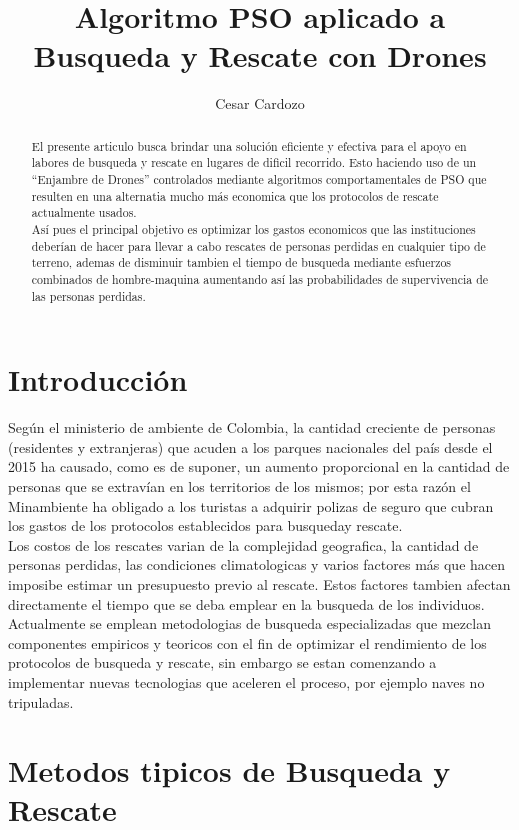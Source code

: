 \documentclass[11pt, twocolumn,letterpaper]{article}
\author{Cesar Cardozo}
\title{Algoritmo PSO aplicado a Busqueda y Rescate con Drones}
\begin{document}
\maketitle
\begin{abstract}
El presente articulo busca brindar una solución eficiente y efectiva para el apoyo en labores de busqueda y rescate en lugares de dificil recorrido. Esto haciendo uso de un ``Enjambre de Drones'' controlados mediante algoritmos comportamentales de PSO que resulten en una alternatia mucho más economica que los protocolos de rescate actualmente usados.\\

Así pues el principal objetivo es optimizar los gastos economicos que las instituciones deberían de hacer para llevar a cabo rescates de personas perdidas en cualquier tipo de terreno, ademas de disminuir tambien el tiempo de busqueda mediante esfuerzos combinados de hombre-maquina aumentando así las probabilidades de supervivencia de las personas perdidas.
\end{abstract}
\section{Introducción}
Según el ministerio de ambiente de Colombia, la cantidad creciente de personas (residentes y extranjeras) que acuden a los parques nacionales del país desde el 2015 ha causado, como es de suponer, un aumento proporcional en la cantidad de personas que se extravían en los territorios de los mismos; por esta razón el Minambiente ha obligado a los turistas a adquirir polizas de seguro que cubran los gastos de los protocolos establecidos para busqueday rescate.\\

Los costos de los rescates varian de la complejidad geografica, la cantidad de personas perdidas, las condiciones climatologicas y varios factores más que hacen imposibe estimar un presupuesto previo al rescate. Estos factores tambien afectan directamente el tiempo que se deba emplear en la busqueda de los individuos.\\

Actualmente se emplean metodologias de busqueda especializadas que mezclan componentes empiricos y teoricos con el fin de optimizar el rendimiento de los protocolos de busqueda y rescate, sin embargo se estan comenzando a implementar nuevas tecnologias que aceleren el proceso, por ejemplo naves no tripuladas.\\

\section{Metodos tipicos de Busqueda y Rescate}
\end{document}
